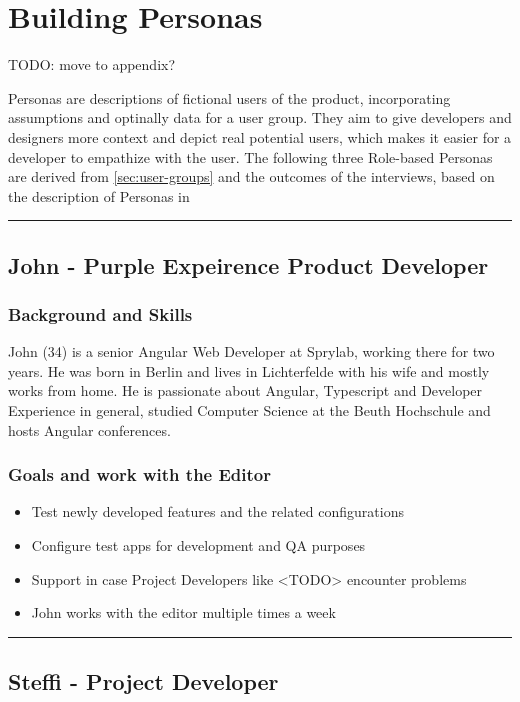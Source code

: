 \section{Building Personas}
\label{sec:personas}

TODO: move to appendix?

Personas are descriptions of fictional users of the product, incorporating assumptions and optinally data for a user group.
They aim to give developers and designers more context and depict real potential users, which makes it easier for a developer to empathize with the user.
The following three Role-based Personas are derived from \ref{sec:user-groups} and the outcomes of the interviews, based on the description of Personas in \cite[pp. 403-405]{Interactiondesign:2019ys}
\\
\hrule
\subsection{John - Purple Expeirence Product Developer}
\label{subsec:persona:productdev}
\subsubsection{Background and Skills}
John (34) is a senior Angular Web Developer at Sprylab, working there for two years. He was born in Berlin and lives in Lichterfelde with his wife and mostly works from home. He is passionate about Angular, Typescript and Developer Experience in general, studied Computer Science at the Beuth Hochschule and hosts Angular conferences.
\\
\subsubsection{Goals and work with the Editor}
\begin{itemize}
  \item Test newly developed features and the related configurations
  \item Configure test apps for development and QA purposes
  \item Support in case Project Developers like <TODO> encounter problems
  \item John works with the editor multiple times a week
\end{itemize}

\hrule
\subsection{Steffi - Project Developer}
\label{subsec:persona:projectdev}

